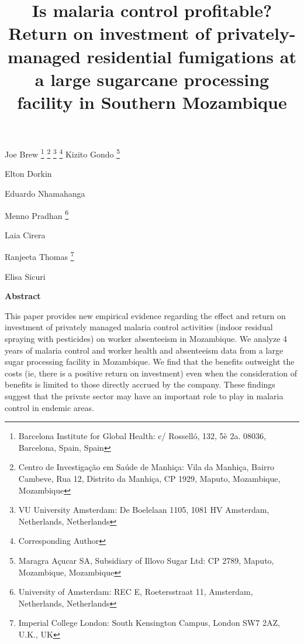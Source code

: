 \documentclass[]{article}
\title{Is malaria control profitable? Return on investment of privately-managed
residential fumigations at a large sugarcane processing facility in
Southern Mozambique}
\author{}
\date{}
\let\rmarkdownfootnote\footnote%
\def\footnote{\protect\rmarkdownfootnote}
\newcommand{\footremember}[2]{%
    \footnote{#2}
    \newcounter{#1}
    \setcounter{#1}{\value{footnote}}%
}
\newcommand{\footrecall}[1]{%
    \footnotemark[\value{#1}]%
}
\begin{document}
\maketitle

\begin{center}
\begin{large}

Joe Brew\footremember{isglobal}{Barcelona Institute for Global Health: c/ Rosselló, 132, 5è 2a. 08036, Barcelona, Spain, Spain}\footremember{cism}{Centro de Investigação em Saúde de Manhiça: Vila da Manhiça, Bairro Cambeve, Rua 12, Distrito da Manhiça, CP 1929, Maputo, Mozambique, Mozambique}\footremember{vu}{VU University Amsterdam: De Boelelaan 1105, 1081 HV Amsterdam, Netherlands, Netherlands} \footnote{Corresponding Author}
Kizito Gondo\footremember{ma}{Maragra Açucar SA, Subsidiary of Illovo Sugar Ltd: CP 2789, Maputo, Mozambique, Mozambique}
Elton Dorkin\footrecall{ma}
Eduardo Nhamahanga\footrecall{ma}
Menno Pradhan\footrecall{vu}\footremember{uva}{University of Amsterdam: REC E, Roetersstraat 11, Amsterdam, Netherlands, Netherlands}
Laia Cirera\footrecall{isglobal}\footrecall{cism}
Ranjeeta Thomas\footremember{icl}{Imperial College London: South Kensington Campus, London SW7 2AZ, U.K., UK}
Elisa Sicuri\footrecall{isglobal}\footrecall{cism}\footrecall{icl}

\end{large}
\end{center}

\vspace{5mm}

\begin{center}
\textbf{Abstract}  
\end{center}

\vspace{5mm}

\begin{center}
\begin{changemargin}{3cm}{3cm} 

This paper provides new empirical evidence regarding the effect and return on investment of privately managed malaria control activities (indoor residual spraying with pesticides) on worker absenteeism in Mozambique. We analyze 4 years of malaria control and worker health and absenteeism data from a large sugar processing facility in Mozambique. We find that the benefits outweight the costs (ie, there is a positive return on investment) even when the consideration of benefits is limited to those directly accrued by the company. These findings suggest that the private sector may have an important role to play in malaria control in endemic areas.

\end{changemargin}
\end{center}
\end{document}
